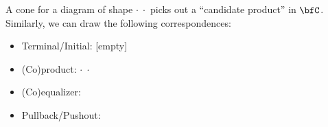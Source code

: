 \documentclass[12pt,twoside]{reedthesis}
\begin{document}
\begin{example}
  A cone for a diagram of shape $·\;·$
  picks out a ``candidate product'' in $\bfC$. Similarly, we can draw the
  following correspondences:
  \begin{itemize}\renewcommand{\labelitemi}{$∘$}
    \itemsep-0.2em
    \item \vspace{-0.3em} Terminal/Initial: [empty]
    \item (Co)product: $·\;·$
    \item (Co)equalizer:
    \item Pullback/Pushout:
  \end{itemize}
\end{example}
\end{document}
